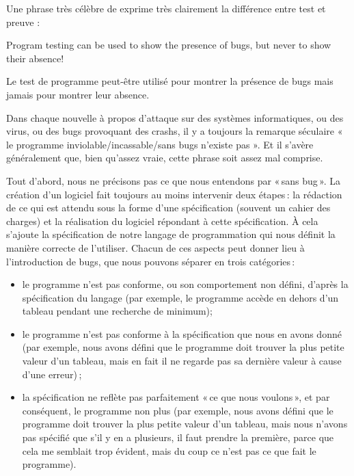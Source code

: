 Une phrase très célèbre de  exprime très clairement la différence entre
test et preuve :



\begin{Quotation}[Dijkstra]
Program testing can be used to show the presence of bugs, but never to show
their absence!
\end{Quotation}



Le test de programme peut-être utilisé pour montrer la présence de bugs mais
jamais pour montrer leur absence.





Dans chaque nouvelle à propos d'attaque sur des systèmes informatiques, ou
des virus, ou des bugs provoquant des crashs, il y a toujours la remarque
séculaire « le programme inviolable/incassable/sans bugs n'existe pas ». Et
il s'avère généralement que, bien qu'assez vraie, cette phrase soit assez
mal comprise.



Tout d’abord, nous ne précisons pas ce que nous entendons par « sans bug ».
La création d’un logiciel fait toujours au moins intervenir deux étapes : la
rédaction de ce qui est attendu sous la forme d’une spécification (souvent
un cahier des charges) et la réalisation du logiciel répondant à cette
spécification. À cela s’ajoute la spécification de notre langage de
programmation qui nous définit la manière correcte de l’utiliser. Chacun de
ces aspects peut donner lieu à l’introduction de bugs, que nous pouvons
séparer en trois catégories :


\begin{itemize}
\item le programme n’est pas conforme, ou son comportement non défini,
      d’après la spécification du langage (par exemple, le programme accède
      en dehors d’un tableau pendant une recherche de minimum);
\item le programme n’est pas conforme à la spécification que nous en avons
      donné (par exemple, nous avons défini que le programme doit trouver
      la plus petite valeur d’un tableau, mais en fait il ne regarde pas sa
      dernière valeur à cause d’une erreur) ;
\item la spécification ne reflète pas parfaitement « ce que nous voulons »,
      et par conséquent, le programme non plus (par exemple, nous avons
      défini que le programme doit trouver la plus petite valeur d’un
      tableau, mais nous n’avons pas spécifié que s’il y en a plusieurs, il
      faut prendre la première, parce que cela me semblait trop évident,
      mais du coup ce n’est pas ce que fait le programme).
\end{itemize}


